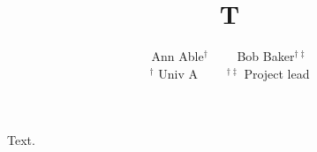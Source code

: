 \documentclass{article}
\title{T}
\author{Ann Able$^{\dagger}$ \ \ \ \ Bob Baker$^{\dagger\ddagger}$ \\ $^{\dagger}$ Univ A \ \ \ \ $^{\dagger\ddagger}$ Project lead}
\begin{document}
\maketitle
Text.
\end{document}
